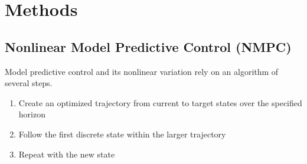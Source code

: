 \documentclass[11pt, titlepage]{article}
\begin{document}
    




\section{Methods}

\subsection{Nonlinear Model Predictive Control (NMPC)}

Model predictive control \cite{MPC} and its nonlinear variation rely on an algorithm of several steps.
\begin{enumerate}
    \item Create an optimized trajectory from current to target states over the specified horizon
    \item Follow the first discrete state within the larger trajectory
    \item Repeat with the new state
\end{enumerate}
\end{document}
